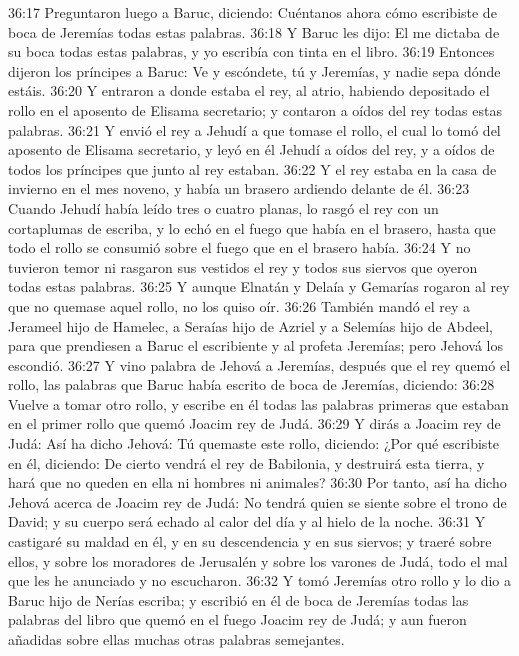 36:17 Preguntaron luego a Baruc, diciendo: Cuéntanos ahora cómo escribiste de boca de Jeremías todas estas palabras. 
36:18 Y Baruc les dijo: El me dictaba de su boca todas estas palabras, y yo escribía con tinta en el libro. 
36:19 Entonces dijeron los príncipes a Baruc: Ve y escóndete, tú y Jeremías, y nadie sepa dónde estáis. 
36:20 Y entraron a donde estaba el rey, al atrio, habiendo depositado el rollo en el aposento de Elisama secretario; y contaron a oídos del rey todas estas palabras. 
36:21 Y envió el rey a Jehudí a que tomase el rollo, el cual lo tomó del aposento de Elisama secretario, y leyó en él Jehudí a oídos del rey, y a oídos de todos los príncipes que junto al rey estaban. 
36:22 Y el rey estaba en la casa de invierno en el mes noveno, y había un brasero ardiendo delante de él. 
36:23 Cuando Jehudí había leído tres o cuatro planas, lo rasgó el rey con un cortaplumas de escriba, y lo echó en el fuego que había en el brasero, hasta que todo el rollo se consumió sobre el fuego que en el brasero había. 
36:24 Y no tuvieron temor ni rasgaron sus vestidos el rey y todos sus siervos que oyeron todas estas palabras. 
36:25 Y aunque Elnatán y Delaía y Gemarías rogaron al rey que no quemase aquel rollo, no los quiso oír. 
36:26 También mandó el rey a Jerameel hijo de Hamelec, a Seraías hijo de Azriel y a Selemías hijo de Abdeel, para que prendiesen a Baruc el escribiente y al profeta Jeremías; pero Jehová los escondió. 
36:27 Y vino palabra de Jehová a Jeremías, después que el rey quemó el rollo, las palabras que Baruc había escrito de boca de Jeremías, diciendo: 
36:28 Vuelve a tomar otro rollo, y escribe en él todas las palabras primeras que estaban en el primer rollo que quemó Joacim rey de Judá. 
36:29 Y dirás a Joacim rey de Judá: Así ha dicho Jehová: Tú quemaste este rollo, diciendo: ¿Por qué escribiste en él, diciendo: De cierto vendrá el rey de Babilonia, y destruirá esta tierra, y hará que no queden en ella ni hombres ni animales? 
36:30 Por tanto, así ha dicho Jehová acerca de Joacim rey de Judá: No tendrá quien se siente sobre el trono de David; y su cuerpo será echado al calor del día y al hielo de la noche. 
36:31 Y castigaré su maldad en él, y en su descendencia y en sus siervos; y traeré sobre ellos, y sobre los moradores de Jerusalén y sobre los varones de Judá, todo el mal que les he anunciado y no escucharon. 
36:32 Y tomó Jeremías otro rollo y lo dio a Baruc hijo de Nerías escriba; y escribió en él de boca de Jeremías todas las palabras del libro que quemó en el fuego Joacim rey de Judá; y aun fueron añadidas sobre ellas muchas otras palabras semejantes. 
